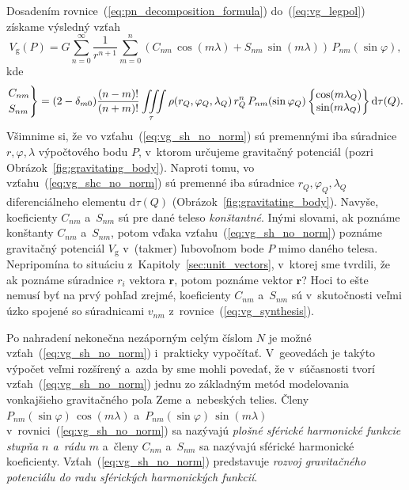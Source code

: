 \documentclass[a4paper,12pt]{book}
\newcommand{\diff}{\mathrm d}
\newcommand{\gidx}{\mathrm g}
\let\vec\mathbf
\begin{document}
Dosadením rovnice~(\ref{eq:pn_decomposition_formula}) do~(\ref{eq:vg_legpol})
získame výsledný vzťah
%
\begin{equation}
\label{eq:vg_sh_no_norm}
V_\gidx(P) = G \sum_{n = 0}^\infty \frac{1}{r^{n + 1}} \sum_{m = 0}^{n} \left(
C_{nm} \, \cos(m\lambda) + S_{nm} \, \sin(m\lambda)\right) \,
P_{nm}(\sin\varphi){,}
\end{equation}
%
kde
%
\begin{equation}
\label{eq:vg_shc_no_norm}
\begin{rcases}
C_{nm}\\
S_{nm}
\end{rcases}
= (2 - \delta_{m0}) \frac{(n - m)!}{(n + m)!} \iiint\limits_{\tau} \rho(r_Q,
\varphi_Q, \lambda_Q) \, r_Q^n \, P_{nm}(\sin\varphi_Q)
%
\begin{Bmatrix}
\cos(m\lambda_Q)\\
\sin(m\lambda_Q)
\end{Bmatrix}
%
\diff\tau(Q){.}
\end{equation}
%
Všimnime si, že vo vzťahu~(\ref{eq:vg_sh_no_norm}) sú premennými iba súradnice
$r, \varphi, \lambda$ výpočtového bodu $P$, v~ktorom určujeme gravitačný
potenciál (pozri Obrázok~\ref{fig:gravitating_body}).  Naproti tomu, vo
vzťahu~(\ref{eq:vg_shc_no_norm}) sú premenné iba súradnice $r_Q,\varphi_Q,
\lambda_Q$ diferenciálneho elementu $\diff\tau(Q)$
(Obrázok~\ref{fig:gravitating_body}).  Navyše, koeficienty $C_{nm}$ a~$S_{nm}$
sú pre dané teleso \emph{konštantné}.  Inými slovami, ak poznáme konštanty
$C_{nm}$ a~$S_{nm}$, potom vďaka vzťahu~(\ref{eq:vg_sh_no_norm}) poznáme
gravitačný potenciál $V_\gidx$ v~(takmer) ľubovoľnom bode $P$ mimo daného
telesa.  Nepripomína to situáciu z~Kapitoly~\ref{sec:unit_vectors}, v~ktorej
sme tvrdili, že ak poznáme súradnice $r_i$ vektora $\vec r$, potom poznáme
vektor $\vec r$?  Hoci to ešte nemusí byť na prvý pohľad zrejmé, koeficienty
$C_{nm}$ a~$S_{nm}$ sú v~skutočnosti veľmi úzko spojené so súradnicami $v_{nm}$
z~rovnice~(\ref{eq:vg_synthesis}).

Po nahradení nekonečna nezáporným celým číslom $N$ je možné
vzťah~(\ref{eq:vg_sh_no_norm}) i~prakticky vypočítať.  V~geovedách je takýto
výpočet veľmi rozšírený a~azda by sme mohli povedať, že v~súčasnosti tvorí
vzťah~(\ref{eq:vg_sh_no_norm}) jednu zo základným metód modelovania vonkajšieho
gravitačného poľa Zeme a~nebeských telies.  Členy $P_{nm}(\sin\varphi) \,
\cos(m\lambda)$ a~$ P_{nm}(\sin\varphi) \, \sin(m\lambda)$
v~rovnici~(\ref{eq:vg_sh_no_norm}) sa nazývajú \emph{plošné sférické harmonické
funkcie stupňa $n$ a~rádu $m$} a~členy $C_{nm}$ a~$S_{nm}$ sa nazývajú sférické
harmonické koeficienty.  Vzťah~(\ref{eq:vg_sh_no_norm}) predstavuje
\emph{rozvoj gravitačného potenciálu do radu sférických harmonických funkcií}.
\end{document}
